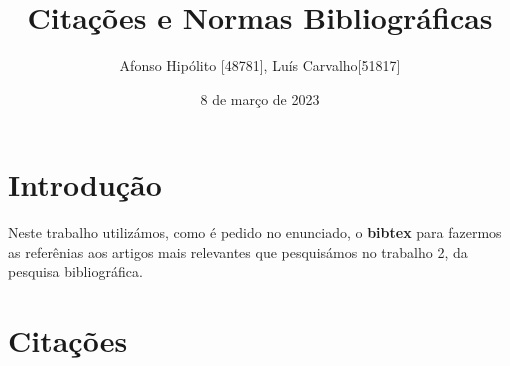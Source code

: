 \documentclass{article}
\title{Citações e Normas Bibliográficas}
\author{Afonso Hipólito [48781], Luís Carvalho[51817]}
\date{8 de março de 2023}
\begin{document}
\maketitle

\section{Introdução}
Neste trabalho utilizámos, como é pedido no enunciado, o \textbf{bibtex} para fazermos as referênias aos artigos mais relevantes que pesquisámos no trabalho 2, da pesquisa bibliográfica. 

\section{Citações}

    \cite{citeseerx} \\
    \cite{yaroslavvb} \\
    \cite{ibmcloud} \\
    \cite{elitedatascience} \\
    \cite{geeksover} \\
    \cite{medium} \\
    \cite{medium2} \\ 
    \cite{analyticsvidhya} \\
    \cite{towardsdatascience} \\
    \cite{dustinstansbury}
    

\printbibliography[title=Referências]
\end{document}

